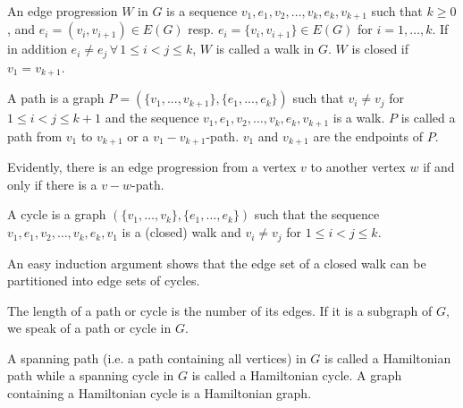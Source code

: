 \begin{definition}
An edge progression $W$ in $G$ is a sequence $v_1, e_1, v_2, \dots , v_k, e_k, v_{k+1}$ such that $k 
\ge 0$,
and $e_i = (v_i, v_{i+ 1}) \in E(G)$ resp. $e_i = \{v_i, v_{i+1}\}\in E(G)$ for $i = 1, \dots , k$. If in
addition $e_i \ne e_j \,\forall\, 1 \le i < j \le k$, $W$ is called a walk in $G$. $W$ is closed if
$v_1 = v_{k+1}$. 

A path is a graph $P = (\{v_1, ... , v_{k+1}\}, \{e_1, ... , e_k\})$ such that $v_i \ne v_j$ for
$1 \le i < j \le k + 1$ and the sequence $v_1 , e_1 , v_2, \dots , v_k, e_k, v_{k+1}$ is a walk. $P$ is
called a path from $v_1$ to $v_{k+1}$ or a $v_1 - v_{k+1}$-path. $v_1$ and $v_{k+1}$ are the endpoints
of $P$.
 
\end{definition}
Evidently, there is an edge progression from a vertex $v$ to another
vertex $w$ if and only if there is a $v-w$-path.
\begin{definition}

A cycle is a graph $(\{v_1, \dots , v_k\}, \{e_1, \dots, e_k\})$ such that the sequence $v_1, e_1, v_2, 
\dots , v_k,e_k,v_1$ is a (closed) walk and $v_i \ne v_j$ for $1 \le i < j\le k$.
 
\end{definition}
An easy induction argument shows that the edge set of a closed walk can be
partitioned into edge sets of cycles.
 
\begin{definition}
The length of a path or cycle is the number of its edges. If it is a subgraph
of $G$, we speak of a path or cycle in $G$. 
\end{definition}

\begin{definition}
A spanning path (i.e. a path containing all vertices) in $G$ is called a Hamiltonian path while a spanning cycle in $G$ 
is called a Hamiltonian cycle. A graph containing a Hamiltonian cycle is a Hamiltonian graph.
\end{definition}



